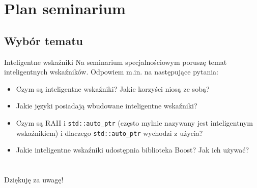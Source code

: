 \section{Plan seminarium}
\subsection{Wybór tematu}
\begin{frame}{Inteligentne wskaźniki}
	Na seminarium specjalnościowym poruszę temat inteligentnych wskaźników.
	Odpowiem m.in. na następujące pytania: \pause
	\begin{itemize}
		\item Czym są inteligentne wskaźniki? Jakie korzyści niosą ze sobą? \pause
		\item Jakie języki posiadają wbudowane inteligentne wskaźniki?       \pause
		\item Czym są RAII i \texttt{std::auto\_ptr} (często mylnie nazywany jest
		  inteligentnym wskaźnikiem) i dlaczego \texttt{std::auto\_ptr}
		  wychodzi z użycia?              \pause
		\item Jakie inteligentne wskaźniki udostępnia biblioteka Boost?  
		  Jak ich używać?
	\end{itemize}
\end{frame}



\section{}
\begin{frame}
  \begin{center}
    \huge
    Dziękuję za uwagę!
  \end{center}
 

\end{frame}


